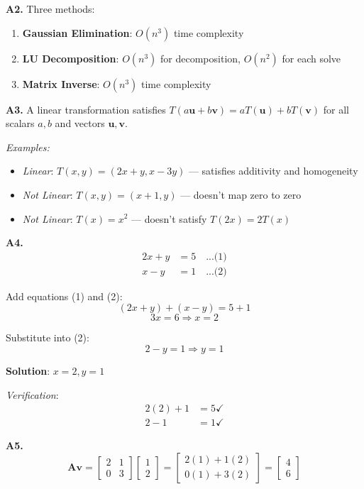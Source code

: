 \documentclass[12pt,a4paper]{article}
\theoremstyle{definition}
\begin{document}
\textbf{A2.} Three methods:
\begin{enumerate}
\item \textbf{Gaussian Elimination}: $O(n^3)$ time complexity
\item \textbf{LU Decomposition}: $O(n^3)$ for decomposition, $O(n^2)$ for each solve
\item \textbf{Matrix Inverse}: $O(n^3)$ time complexity
\end{enumerate}

\textbf{A3.} A linear transformation satisfies $T(a\mathbf{u} + b\mathbf{v}) = aT(\mathbf{u}) + bT(\mathbf{v})$ for all scalars $a, b$ and vectors $\mathbf{u}, \mathbf{v}$.

\textit{Examples:}
\begin{itemize}
\item \textit{Linear}: $T(x, y) = (2x + y, x - 3y)$ — satisfies additivity and homogeneity
\item \textit{Not Linear}: $T(x, y) = (x + 1, y)$ — doesn't map zero to zero
\item \textit{Not Linear}: $T(x) = x^2$ — doesn't satisfy $T(2x) = 2T(x)$
\end{itemize}

\textbf{A4.}
\begin{align*}
2x + y &= 5 \quad \text{...(1)} \\
x - y &= 1 \quad \text{...(2)}
\end{align*}

Add equations (1) and (2):
\[
(2x + y) + (x - y) = 5 + 1
\]
\[
3x = 6 \Rightarrow x = 2
\]

Substitute into (2):
\[
2 - y = 1 \Rightarrow y = 1
\]

\textbf{Solution}: $x = 2, y = 1$

\textit{Verification}:
\begin{align*}
2(2) + 1 &= 5 \checkmark \\
2 - 1 &= 1 \checkmark
\end{align*}

\textbf{A5.}
\[
\mathbf{Av} = \begin{bmatrix} 2 & 1 \\ 0 & 3 \end{bmatrix} \begin{bmatrix} 1 \\ 2 \end{bmatrix} = \begin{bmatrix} 2(1) + 1(2) \\ 0(1) + 3(2) \end{bmatrix} = \begin{bmatrix} 4 \\ 6 \end{bmatrix}
\]
\end{document}
